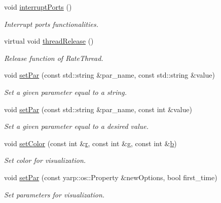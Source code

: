 \begin{DoxyCompactItemize}
\mbox{\label{classSuperqVisualization_a0fceb3fcc3bd4eadbf9d68abb4b0badc}} 
void \mbox{\hyperlink{classSuperqVisualization_a0fceb3fcc3bd4eadbf9d68abb4b0badc}{interrupt\+Ports}} ()
\begin{DoxyCompactList}\small\item\em Interrupt ports functionalities. \end{DoxyCompactList}\item 
\mbox{\label{classSuperqVisualization_ae79d791d2accf581cbe0502d579f5416}} 
virtual void \mbox{\hyperlink{classSuperqVisualization_ae79d791d2accf581cbe0502d579f5416}{thread\+Release}} ()
\begin{DoxyCompactList}\small\item\em Release function of Rate\+Thread. \end{DoxyCompactList}\item 
void \mbox{\hyperlink{classSuperqVisualization_acbc374ffecb809ca16853c9475d7f347}{set\+Par}} (const std\+::string \&par\+\_\+name, const std\+::string \&value)
\begin{DoxyCompactList}\small\item\em Set a given parameter equal to a string. \end{DoxyCompactList}\item 
void \mbox{\hyperlink{classSuperqVisualization_a2403b8fcb9448e61866fd39035a482f0}{set\+Par}} (const std\+::string \&par\+\_\+name, const int \&value)
\begin{DoxyCompactList}\small\item\em Set a given parameter equal to a desired value. \end{DoxyCompactList}\item 
void \mbox{\hyperlink{classSuperqVisualization_a82eb6b92c07720b35c714a3c8e2f88a3}{set\+Color}} (const int \&\mbox{\hyperlink{classSuperqVisualization_aee081a694340a9a8658a960872cb6172}{r}}, const int \&\mbox{\hyperlink{classSuperqVisualization_a51cc6e3ac3ee243250a7042f00c813d1}{g}}, const int \&\mbox{\hyperlink{classSuperqVisualization_a96c39287f863466bbbc21342dd62b68a}{b}})
\begin{DoxyCompactList}\small\item\em Set color for visualization. \end{DoxyCompactList}\item 
void \mbox{\hyperlink{classSuperqVisualization_a5250a90e5865bf45c0bd8ae919b8eab0}{set\+Par}} (const yarp\+::os\+::\+Property \&new\+Options, bool first\+\_\+time)
\begin{DoxyCompactList}\small\item\em Set parameters for visualization. \end{DoxyCompactList}\item 

\end{DoxyCompactItemize}

